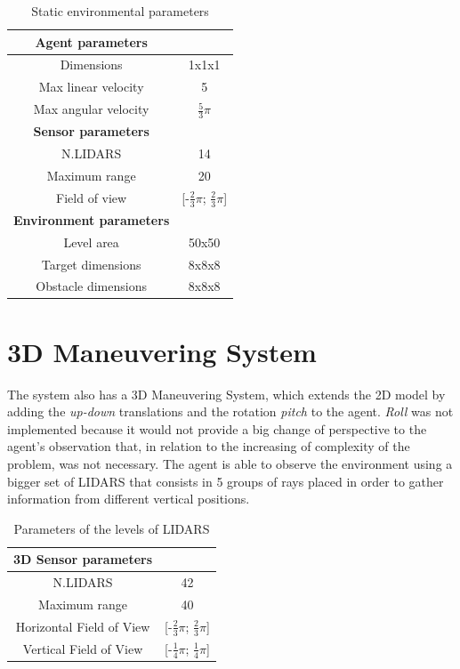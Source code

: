\documentclass{ifacconf}
\begin{document}
\begin{table}[ht]
\centering
\caption{Static environmental parameters}
\begin{tabular}[t]{cc}
\hline
\textbf{Agent parameters}&\\
\hline
Dimensions&1x1x1\\
Max linear velocity&5\\
Max angular velocity&$\frac{5}{3} \pi$\\[0.1cm]
\hline
\textbf{Sensor parameters}&\\
\hline
N.LIDARS&14\\
Maximum range&20\\
Field of view&[-$\frac{2}{3} \pi$; $\frac{2}{3} \pi$]\\[0.1cm]
\hline
\textbf{Environment parameters}&\\
\hline
Level area&50x50\\
Target dimensions&8x8x8\\
Obstacle dimensions&8x8x8\\
\end{tabular}
\end{table}%

\section{3D Maneuvering System} %
The system also has a 3D Maneuvering System, which extends the 2D model by adding the \emph{up-down} translations and the rotation \emph{pitch} to the agent. \emph{Roll} was not implemented because it would not provide a big change of perspective to the agent's observation that, in relation to the increasing of complexity of the problem, was not necessary. The agent is able to observe the environment using a bigger set of LIDARS that consists in 5 groups of rays placed in order to gather information from different vertical positions.

\begin{table}[ht]
\centering
\caption{Parameters of the levels of LIDARS}
\begin{tabular}[t]{cc}
\textbf{3D Sensor parameters}&\\
\hline
N.LIDARS&42\\
Maximum range&40\\
Horizontal Field of View &[-$\frac{2}{3} \pi$; $\frac{2}{3} \pi$]\\[0.1cm]
Vertical Field of View &[-$\frac{1}{4} \pi$; $\frac{1}{4} \pi$]\\[0.1cm]
\hline
\end{tabular}
\end{table}%
\end{document}
